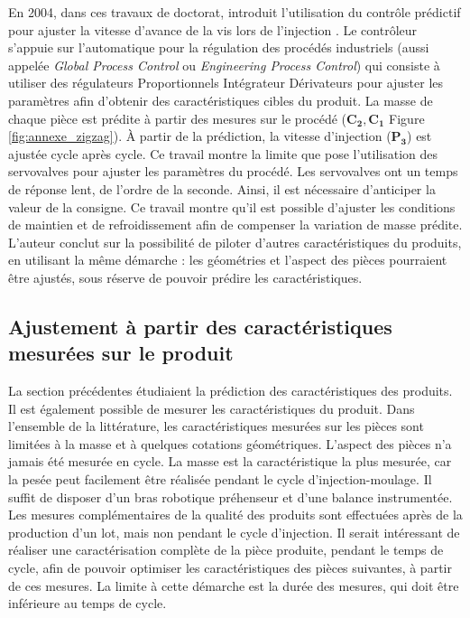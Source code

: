 En 2004, dans ces travaux de doctorat, \citeauthor{yang_injection_2004} introduit l'utilisation du contrôle prédictif pour ajuster la vitesse d'avance de la vis lors de l'injection \cite{yang_injection_2004}.
Le contrôleur s'appuie sur l'automatique pour la régulation des procédés industriels (aussi appelée \textit{Global Process Control} ou \textit{Engineering Process Control}) qui consiste à utiliser des régulateurs Proportionnels Intégrateur Dérivateurs pour ajuster les paramètres afin d'obtenir des caractéristiques cibles du produit.
La masse de chaque pièce est prédite à partir des mesures sur le procédé ($\boldsymbol{C_2, C_1}$ Figure \ref{fig:annexe_zigzag}).
À partir de la prédiction, la vitesse d'injection ($\boldsymbol{P_3}$) est ajustée cycle après cycle.
Ce travail montre la limite que pose l'utilisation des servovalves pour ajuster les paramètres du procédé.
Les servovalves ont un temps de réponse lent, de l'ordre de la seconde.
Ainsi, il est nécessaire d'anticiper la valeur de la consigne.  %
Ce travail montre qu'il est possible d'ajuster les conditions de maintien et de refroidissement afin de compenser la variation de masse prédite.
L'auteur conclut sur la possibilité de piloter d'autres caractéristiques du produits, en utilisant la même démarche : les géométries et l'aspect des pièces pourraient être ajustés, sous réserve de pouvoir prédire les caractéristiques.

\subsection{Ajustement à partir des caractéristiques mesurées sur le produit}
La section précédentes étudiaient la prédiction des caractéristiques des produits.
Il est également possible de mesurer les caractéristiques du produit.
Dans l'ensemble de la littérature, les caractéristiques mesurées sur les pièces sont limitées à la masse et à quelques cotations géométriques.
L'aspect des pièces n'a jamais été mesurée en cycle.
La masse est la caractéristique la plus mesurée, car la pesée peut facilement être réalisée pendant le cycle d'injection-moulage.
Il suffit de disposer d'un bras robotique préhenseur et d'une balance instrumentée.
Les mesures complémentaires de la qualité des produits sont effectuées après de la production d'un lot, mais non pendant le cycle d'injection.
Il serait intéressant de réaliser une caractérisation complète de la pièce produite, pendant le temps de cycle, afin de pouvoir optimiser les caractéristiques des pièces suivantes, à partir de ces mesures.
La limite à cette démarche est la durée des mesures, qui doit être inférieure au temps de cycle.

